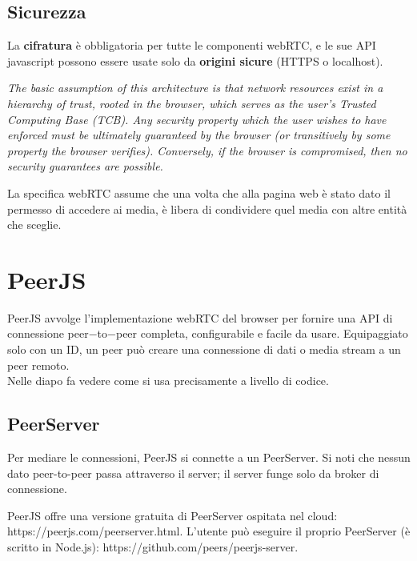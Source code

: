 \subsection{Sicurezza}
La \textbf{cifratura} è obbligatoria per tutte le componenti webRTC, e le sue API javascript possono essere usate solo da \textbf{origini sicure} (HTTPS o localhost).

\emph{The basic assumption of this architecture is that network resources
exist in a hierarchy of trust, rooted in the browser, which serves as
the user's Trusted Computing Base (TCB). Any security property which
the user wishes to have enforced must be ultimately guaranteed by the
browser (or transitively by some property the browser verifies).
Conversely, if the browser is compromised, then no security
guarantees are possible.}

La specifica webRTC assume che una volta che alla pagina web è stato dato il permesso di accedere ai media, è libera di condividere quel media con altre entità che sceglie.

\section{PeerJS}
PeerJS avvolge l'implementazione webRTC del browser per fornire una API di connessione peer$-$to$-$peer completa, configurabile e facile da usare. Equipaggiato solo con un ID, un peer può creare una connessione di dati o media stream a un peer remoto. \\

Nelle diapo fa vedere come si usa precisamente a livello di codice.\\

\subsection{PeerServer}
Per mediare le connessioni, PeerJS si connette a un PeerServer.
Si noti che nessun dato peer-to-peer passa attraverso il server; il server
funge solo da broker di connessione. 

PeerJS offre una versione gratuita di PeerServer ospitata nel cloud: https://peerjs.com/peerserver.html.
L'utente può eseguire il proprio PeerServer (è scritto in Node.js): https://github.com/peers/peerjs-server.